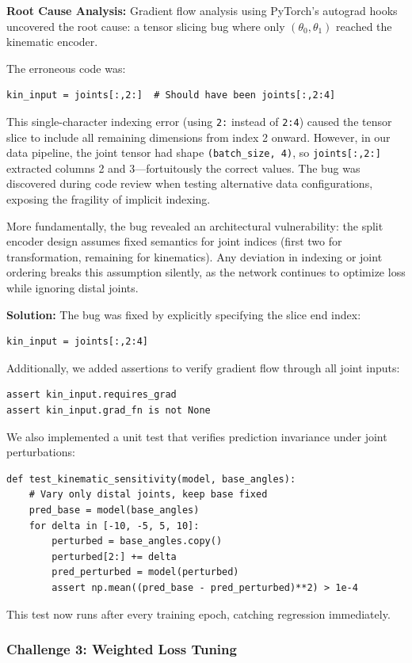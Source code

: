 \documentclass[12pt,a4paper,oneside]{report}
\begin{document}
\textbf{Root Cause Analysis:} Gradient flow analysis using PyTorch's autograd hooks uncovered the root cause: a tensor slicing bug where only $(\theta_0, \theta_1)$ reached the kinematic encoder.

The erroneous code was:
\begin{verbatim}
kin_input = joints[:,2:]  # Should have been joints[:,2:4]
\end{verbatim}
This single-character indexing error (using \texttt{2:} instead of \texttt{2:4}) caused the tensor slice to include all remaining dimensions from index 2 onward. However, in our data pipeline, the joint tensor had shape \texttt{(batch\_size, 4)}, so \texttt{joints[:,2:]} extracted columns 2 and 3---fortuitously the correct values. The bug was discovered during code review when testing alternative data configurations, exposing the fragility of implicit indexing.

More fundamentally, the bug revealed an architectural vulnerability: the split encoder design assumes fixed semantics for joint indices (first two for transformation, remaining for kinematics). Any deviation in indexing or joint ordering breaks this assumption silently, as the network continues to optimize loss while ignoring distal joints.

\textbf{Solution:} The bug was fixed by explicitly specifying the slice end index:
\begin{verbatim}
kin_input = joints[:,2:4]
\end{verbatim}
Additionally, we added assertions to verify gradient flow through all joint inputs:
\begin{verbatim}
assert kin_input.requires_grad
assert kin_input.grad_fn is not None
\end{verbatim}
We also implemented a unit test that verifies prediction invariance under joint perturbations:
\begin{verbatim}
def test_kinematic_sensitivity(model, base_angles):
    # Vary only distal joints, keep base fixed
    pred_base = model(base_angles)
    for delta in [-10, -5, 5, 10]:
        perturbed = base_angles.copy()
        perturbed[2:] += delta
        pred_perturbed = model(perturbed)
        assert np.mean((pred_base - pred_perturbed)**2) > 1e-4
\end{verbatim}
This test now runs after every training epoch, catching regression immediately.

\subsubsection{Challenge 3: Weighted Loss Tuning}
\end{document}
